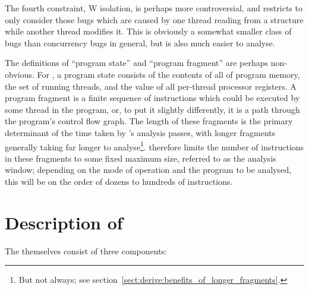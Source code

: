 The fourth constraint, W isolation, is perhaps more controversial, and
restricts {\technique} to only consider those bugs which are caused by
one thread reading from a structure while another thread modifies it.
This is obviously a somewhat smaller class of bugs than concurrency
bugs in general, but is also much easier to analyse.  

The definitions of ``program state'' and ``program fragment'' are
perhaps non-obvious.  For {\technique}, a program state consists of
the contents of all of program memory, the set of running threads, and
the value of all per-thread processor registers.  A program fragment
is a finite sequence of instructions which could be executed by some
thread in the program, or, to put it slightly differently, it is a
path through the program's control flow graph.  The length of these
fragments is the primary determinant of the time taken by
{\technique}'s analysis passes, with longer fragments generally taking
far longer to analyse\footnote{But not always; see
  section~\ref{sect:derive:benefits_of_longer_fragments}.}.
{\Technique} therefore limits the number of instructions in these
fragments to some fixed maximum size, referred to as the analysis
window; depending on the mode of operation and the program to be
analysed, this will be on the order of dozens to hundreds of
instructions.

\section{Description of \StateMachines}
\label{sect:derive:description}


The {\StateMachines} themselves consist of three components:

